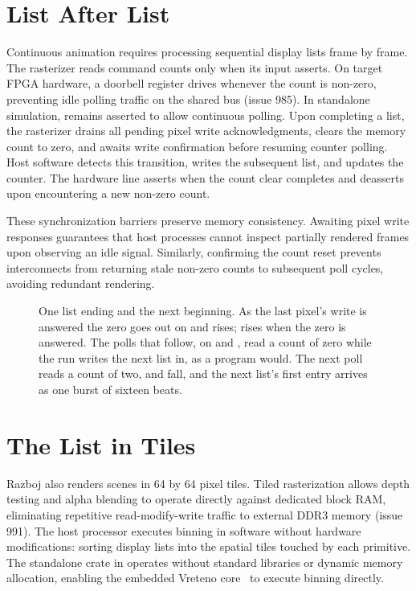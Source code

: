 \documentclass[journal,9pt]{IEEEtran}
\begin{document}
\section{List After List}
\label{sec:g-lists}

Continuous animation requires processing sequential display lists frame by
frame. The rasterizer reads command counts only when its  input
asserts. On target FPGA hardware, a doorbell register drives 
whenever the count is non-zero, preventing idle polling traffic on the shared
bus (issue 985). In standalone simulation,  remains asserted to
allow continuous polling. Upon completing a list, the rasterizer drains all
pending pixel write acknowledgments, clears the memory count to zero, and
awaits write confirmation before resuming counter polling. Host software
detects this transition, writes the subsequent list, and updates the
counter. The hardware  line asserts when the count clear completes
and deasserts upon encountering a new non-zero count.

These synchronization barriers preserve memory consistency. Awaiting pixel
write responses guarantees that host processes cannot inspect partially
rendered frames upon observing an idle signal. Similarly, confirming the
count reset prevents interconnects from returning stale non-zero counts to
subsequent poll cycles, avoiding redundant rendering.

\begin{figure}[t]
\centering

\caption{One list ending and the next beginning. As the last
pixel's write is answered the zero goes out on  and
 rises;  rises when the zero is answered.
The polls that follow, on  and , read a count of
zero while the run writes the next list in, as a program would. The
next poll reads a count of two,  and  fall,
and the next list's first entry arrives as one burst of sixteen beats.}
\label{fig:g-lists}
\end{figure}

\section{The List in Tiles}
\label{sec:g-tiles}

Razboj also renders scenes in 64 by 64 pixel tiles. Tiled rasterization
allows depth testing and alpha blending to operate directly against
dedicated block RAM, eliminating repetitive read-modify-write traffic to
external DDR3 memory (issue 991). The host processor executes binning in
software without hardware modifications: sorting display lists into the
spatial tiles touched by each primitive. The standalone crate
 in  operates without standard
libraries or dynamic memory allocation, enabling the embedded Vreteno
core~\cite{vreteno} to execute binning directly.
\end{document}

